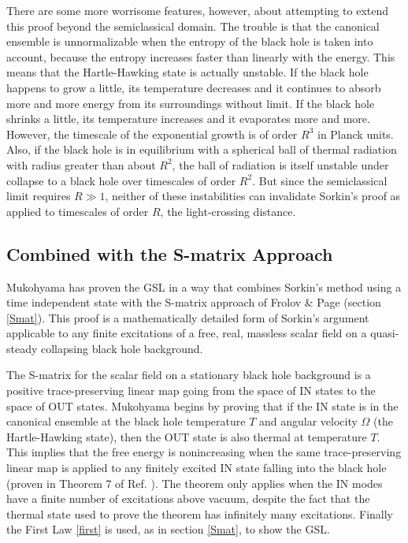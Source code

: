 \documentclass[12pt]{article}
\begin{document}
There are some more worrisome features, however, about attempting to extend this proof beyond the semiclassical domain.  The trouble is that the canonical ensemble is unnormalizable when the entropy of the black hole is taken into account, because the entropy increases faster than linearly with the energy.  This means that the Hartle-Hawking state is actually unstable.  If the black hole happens to grow a little, its temperature decreases and it continues to absorb more and more energy from its surroundings without limit.  If the black hole shrinks a little, its temperature increases and it evaporates more and more.  However, the timescale of the exponential growth is of order $R^3$ in Planck units.  Also, if the black hole is in equilibrium with a spherical ball of thermal radiation with radius greater than about $R^2$, the ball of radiation is itself unstable under collapse to a black hole over timescales of order $R^2$.  But since the semiclassical limit requires $R \gg 1$, neither of these instabilities can invalidate Sorkin's proof as applied to timescales of order $R$, the light-crossing distance.

\subsection{Combined with the S-matrix Approach}\label{comb}

Mukohyama \cite{muko97} has proven the GSL in a way that combines Sorkin's method using a time independent state with the S-matrix approach of Frolov \& Page (section \ref{Smat}).  This proof is a mathematically detailed form of Sorkin's argument applicable to any finite excitations of a free, real, massless scalar field on a quasi-steady collapsing black hole background.

The S-matrix for the scalar field on a stationary black hole background is a positive trace-preserving linear map going from the space of IN states to the space of OUT states.  Mukohyama begins by proving that if the IN state is in the canonical ensemble at the black hole temperature $T$ and angular velocity $\Omega$ (the Hartle-Hawking state), then the OUT state is also thermal at temperature $T$.  This implies that the free energy is nonincreasing when the same trace-preserving linear map is applied to any finitely excited IN state falling into the black hole (proven in Theorem 7 of Ref. \cite{muko97}).  The theorem only applies when the IN modes have a finite number of excitations above vacuum, despite the fact that the thermal state used to prove the theorem has infinitely many excitations.  Finally the First Law \ref{first} is used, as in section \ref{Smat}, to show the GSL.
\end{document}
